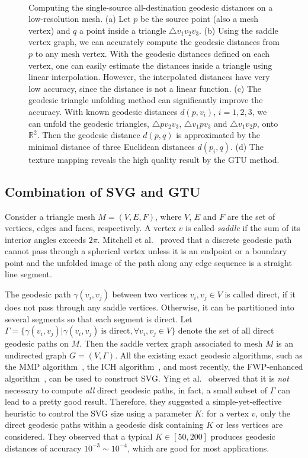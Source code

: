 \begin{figure}[htbp]
  \\
  \caption{Computing the single-source all-destination geodesic distances on a low-resolution mesh.
  (a) Let $p$ be the source point (also a mesh vertex) and $q$ a point inside a triangle $\bigtriangleup v_1v_2v_3$.
  (b) Using the saddle vertex graph, we can accurately compute the geodesic distances from $p$ to any mesh vertex.
  With the geodesic distances defined on each vertex, one can easily estimate the distances inside a triangle using linear interpolation.
  However, the interpolated distances have very low accuracy, since the distance is not a linear function.
  (c) The geodesic triangle unfolding method can significantly improve the accuracy.
  With known geodesic distances $d(p,v_i)$, $i=1,2,3$, we can unfold the geodesic triangles,
  $\bigtriangleup pv_2v_3$, $\bigtriangleup v_1pv_3$ and $\bigtriangleup v_1v_2p$, onto $\mathbb{R}^2$.
  Then the geodesic distance $d(p,q)$ is approximated by the minimal distance of three Euclidean distances $d(p_i,q)$.
  (d) The texture mapping reveals the high quality result by the GTU method.}
  \label{fig:SVGandGTU}
  \end{figure}

\subsection{Combination of SVG and GTU}
  Consider a triangle mesh $M=(V,E,F)$, where $V$, $E$ and $F$ are the set of vertices, edges and faces, respectively.
  A vertex $v$ is called \textit{saddle} if the sum of its interior angles exceeds $2\pi$.
  Mitchell et al.~\cite{Mitchell_Etc:1987} proved that a discrete geodesic path cannot pass through a spherical vertex
  unless it is an endpoint or a boundary point and the unfolded image of the path along any edge sequence is a straight line segment.

  The geodesic path $\gamma(v_i,v_j)$ between two vertices $v_i, v_j\in V$ is called direct, if it does not pass through any saddle vertices.
  Otherwise, it can be partitioned into several segments so that each segment is direct.
  Let $\Gamma=\{\gamma(v_i,v_j)|\gamma(v_i,v_j)~\text{is direct}, \forall v_i,v_j\in V\}$ denote the set of all direct geodesic paths on $M$.
  Then the saddle vertex graph associated to mesh $M$ is an undirected graph $G=(V,\Gamma)$.
  All the existing exact geodesic algorithms, such as the MMP algorithm~\cite{Mitchell_Etc:1987}, the ICH algorithm~\cite{Xin_Wang:2009},
  and most recently, the FWP-enhanced algorithm~\cite{fwp}, can be used to construct SVG.
  Ying et al.~\cite{Ying13SVG} observed that it is \textit{not} necessary to compute \textit{all} direct geodesic paths,
  in fact, a small subset of $\Gamma$ can lead to a pretty good result.
  Therefore, they suggested a simple-yet-effective heuristic to control the SVG size using a parameter $K$:
  for a vertex $v$, only the direct geodesic paths within a geodesic disk containing $K$ or less vertices are considered.
  They observed that a typical $K\in[50, 200]$ produces geodesic distances of accuracy $10^{-3}\sim 10^{-4}$, which are good for most applications.

